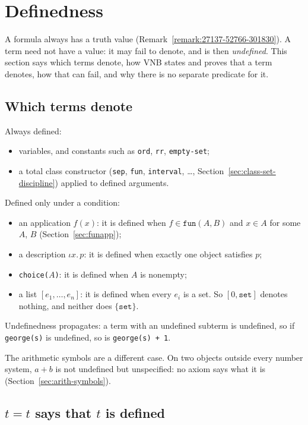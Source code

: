 \section{Definedness}
\label{sec:definedness}

A formula always has a truth value (Remark~\ref{remark:27137-52766-301830}).
A term need not have a value: it may fail to denote, and is then
\emph{undefined}.  This section says which terms denote, how VNB states
and proves that a term denotes, how that can fail, and why there is no
separate predicate for it.

\subsection{Which terms denote}

Always defined:
\begin{itemize}
\item variables, and constants such as \texttt{ord}, \texttt{rr},
  \texttt{empty-set};
\item a total class constructor (\texttt{sep}, \texttt{fun},
  \texttt{interval}, \ldots, Section~\ref{sec:class-set-discipline})
  applied to defined arguments.
\end{itemize}
Defined only under a condition:
\begin{itemize}
\item an application $f(x)$: it is defined when $f \in \mathtt{fun}(A, B)$
  and $x \in A$ for some $A$, $B$ (Section~\ref{sec:funapp});
\item a description $\iota x.\, p$: it is defined when exactly one object
  satisfies $p$;
\item \texttt{choice($A$)}: it is defined when $A$ is nonempty;
\item a list $[e_1, \ldots, e_n]$: it is defined when every $e_i$ is a
  set.  So $[0, \mathtt{set}]$ denotes nothing, and neither does
  $\{\mathtt{set}\}$.
\end{itemize}
Undefinedness propagates: a term with an undefined subterm is undefined,
so if \texttt{george(s)} is undefined, so is \texttt{george(s) + 1}.

The arithmetic symbols are a different case.  On two objects outside
every number system, $a + b$ is not undefined but unspecified: no axiom
says what it is (Section~\ref{sec:arith-symbols}).

\subsection{$t = t$ says that $t$ is defined}

